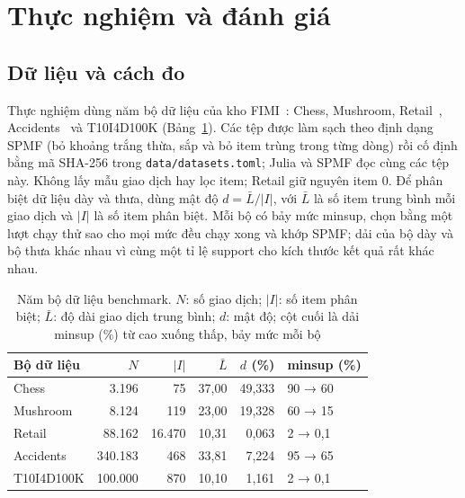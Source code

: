 \section{Thực nghiệm và đánh giá}
\label{sec:eval}

\subsection{Dữ liệu và cách đo}
\label{sec:eval-setup}

Thực nghiệm dùng năm bộ dữ liệu của kho FIMI~\cite{goethals2003fimi}: Chess, Mushroom,
Retail~\cite{brijs1999using}, Accidents~\cite{geurts2003profiling} và T10I4D100K (Bảng~\ref{tab:datasets}).
Các tệp được làm sạch theo định dạng SPMF (bỏ khoảng trắng thừa, sắp và bỏ item trùng trong từng dòng) rồi cố
định bằng mã SHA-256 trong \texttt{data/datasets.toml}; Julia và SPMF đọc cùng các tệp này. Không lấy mẫu
giao dịch hay lọc item; Retail giữ nguyên item 0. Để phân biệt dữ liệu dày và thưa, dùng mật độ
$d = \bar{L}/|I|$, với $\bar{L}$ là số item trung bình mỗi giao dịch và $|I|$ là số item phân biệt. Mỗi bộ có
bảy mức minsup, chọn bằng một lượt chạy thử sao cho mọi mức đều chạy xong và khớp SPMF; dải của bộ dày và bộ
thưa khác nhau vì cùng một tỉ lệ support cho kích thước kết quả rất khác nhau.

\begin{table}[t]
\caption{Năm bộ dữ liệu benchmark. $N$: số giao dịch; $|I|$: số item phân biệt; $\bar{L}$: độ dài giao dịch
trung bình; $d$: mật độ; cột cuối là dải minsup (\%) từ cao xuống thấp, bảy mức mỗi bộ}
\label{tab:datasets}
\centering
\footnotesize
\setlength{\tabcolsep}{3pt}
\begin{tabular}{@{}lrrrrl@{}}
\toprule
Bộ dữ liệu & $N$ & $|I|$ & $\bar{L}$ & $d$ (\%) & minsup (\%) \\
\midrule
Chess & 3.196 & 75 & 37,00 & 49,333 & 90 → 60 \\
Mushroom & 8.124 & 119 & 23,00 & 19,328 & 60 → 15 \\
Retail & 88.162 & 16.470 & 10,31 & 0,063 & 2 → 0,1 \\
Accidents & 340.183 & 468 & 33,81 & 7,224 & 95 → 65 \\
T10I4D100K & 100.000 & 870 & 10,10 & 1,161 & 2 → 0,1 \\
\bottomrule
\end{tabular}
\end{table}

